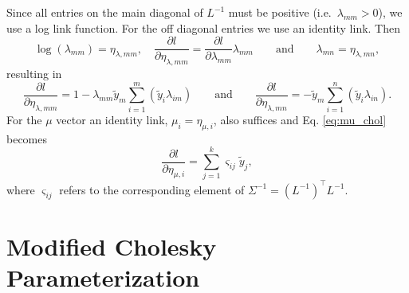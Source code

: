 \documentclass{article}
\begin{document}
Since all entries on the main diagonal of $L^{-1}$ must be positive 
(i.e.\ $\lambda_{mm} > 0$), we use a log link function. For the 
off diagonal entries we use an identity link. Then
%
\begin{equation}
	\log(\lambda_{mm}) = \eta_{\lambda,mm}, \quad
        \frac{\partial l}{\partial \eta_{\lambda,mm}} =
	\frac{\partial l}{\partial \lambda_{mm}} \lambda_{mm}
	\qquad \text{and} \qquad  
        \lambda_{mn} = \eta_{\lambda,mn},
\end{equation}
%
resulting in 
%
\begin{equation}
  \frac{\partial l}{\partial \eta_{\lambda,mm}} =
  1 - \lambda_{mm} \tilde{y}_m \sum_{i=1}^m (\tilde{y}_i \lambda_{im})
  \qquad \text{and} \qquad
  \frac{\partial l}{\partial \eta_{\lambda,mn}} = 
	- \tilde{y}_m \sum_{i = 1}^{n} \left( \tilde{y}_i \lambda_{in} \right).
\end{equation}
%
For the $\mu$ vector an identity link, 
$\mu_i = \eta_{\mu,i}$, also suffices and Eq. \ref{eq:mu_chol} becomes
%
\begin{equation}
  \frac{\partial l}{\partial \eta_{\mu, i}} = 
	\sum_{j=1}^k \varsigma_{ij} \tilde{y}_j, 
\end{equation}
%
where $\varsigma_{ij}$ refers to the corresponding element of 
$\Sigma^{-1} = (L^{-1})^\top L^{-1}$.

\newpage
\section{Modified Cholesky Parameterization}
\end{document}
